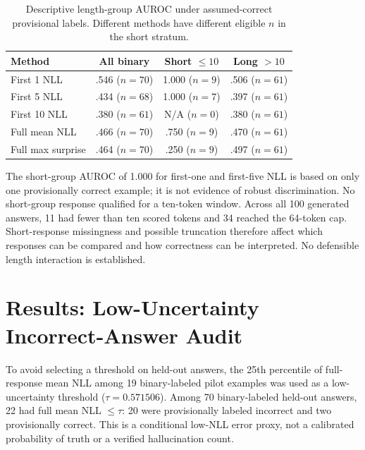 \documentclass[runningheads]{llncs}
\begin{document}
\begin{table}[t]\centering
\caption{Descriptive length-group AUROC under assumed-correct provisional labels. Different methods have different eligible $n$ in the short stratum.}\label{tab:length}
\begin{tabular}{lccc}\toprule
Method & All binary & Short $\leq10$ & Long $>10$\\\midrule
First 1 NLL & .546 ($n=70$) & 1.000 ($n=9$) & .506 ($n=61$)\\
First 5 NLL & .434 ($n=68$) & 1.000 ($n=7$) & .397 ($n=61$)\\
First 10 NLL & .380 ($n=61$) & N/A ($n=0$) & .380 ($n=61$)\\
Full mean NLL & .466 ($n=70$) & .750 ($n=9$) & .470 ($n=61$)\\
Full max surprise & .464 ($n=70$) & .250 ($n=9$) & .497 ($n=61$)\\\bottomrule
\end{tabular}
\end{table}

The short-group AUROC of 1.000 for first-one and first-five NLL is based on only one provisionally correct example; it is not evidence of robust discrimination. No short-group response qualified for a ten-token window. Across all 100 generated answers, 11 had fewer than ten scored tokens and 34 reached the 64-token cap. Short-response missingness and possible truncation therefore affect which responses can be compared and how correctness can be interpreted. No defensible length interaction is established.
\section{Results: Low-Uncertainty Incorrect-Answer Audit}
To avoid selecting a threshold on held-out answers, the 25th percentile of full-response mean NLL among 19 binary-labeled pilot examples was used as a low-uncertainty threshold ($\tau=0.571506$). Among 70 binary-labeled held-out answers, 22 had full mean NLL $\leq\tau$: 20 were provisionally labeled incorrect and two provisionally correct. This is a conditional low-NLL error proxy, not a calibrated probability of truth or a verified hallucination count.
\end{document}
